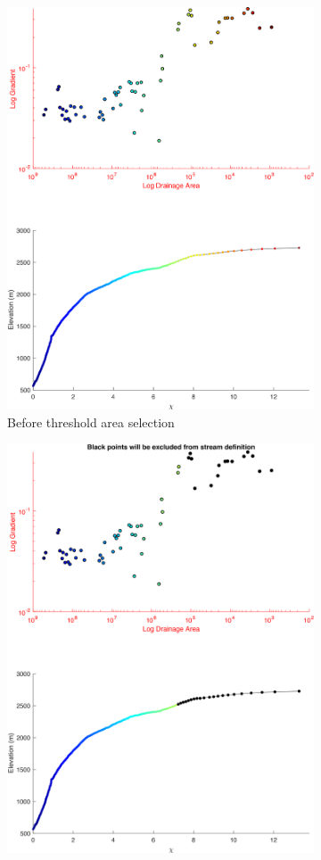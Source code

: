\begin{figure}[H]
	\centering
	\begin{subfigure}{.5\textwidth}
		\centering
		\includegraphics[width=.8\linewidth]{PNGs/B92_StreamThresh_9_prePick.png}
		\caption{Before threshold area selection}
		\label{fig:TSsub1}
	\end{subfigure}%
	\begin{subfigure}{.5\textwidth}
		\centering
		\includegraphics[width=.8\linewidth]{PNGs/B92_StreamThresh_9_postPick.png}

\end{subfigure}
\end{figure}
